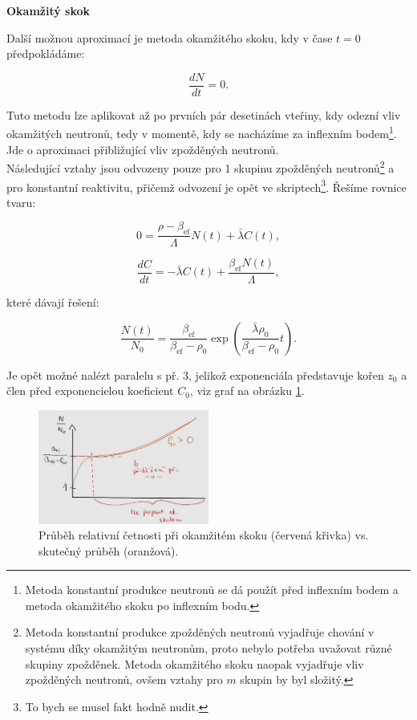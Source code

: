 \textbf{Okamžitý skok}

Další možnou aproximací je metoda okamžitého skoku, kdy v čase $t = 0$ předpokládáme:

$$ \dfrac{dN}{dt} = 0. $$

Tuto metodu lze aplikovat až po prvních pár desetinách vteřiny, kdy odezní vliv okamžitých neutronů, tedy v momentě, kdy se nacházíme za inflexním bodem\footnote{Metoda konstantní produkce neutronů se dá použít před inflexním bodem a metoda okamžitého skoku po inflexním bodu.}. Jde o aproximaci přibližující vliv zpožděných neutronů.\\

Následující vztahy jsou odvozeny pouze pro 1 skupinu zpožděných neutronů\footnote{Metoda konstantní produkce zpožděných neutronů vyjadřuje chování v systému díky okamžitým neutronům, proto nebylo potřeba uvažovat různé skupiny zpožděnek. Metoda okamžitého skoku naopak vyjadřuje vliv zpožděných neutronů, ovšem vztahy pro $m$ skupin by byl složitý.} a pro konstantní reaktivitu, přičemž odvození je opět ve skriptech\footnote{To bych se musel fakt hodně nudit.}. Řešíme rovnice tvaru:

$$ 0 = \dfrac{\rho - \beta_{\text{ef}}}{\Lambda} N(t) + \bar{\lambda} C(t), $$

$$ \dfrac{dC}{dt} = -\bar{\lambda} C(t) + \dfrac{\beta_{\text{ef}}  N(t)}{\Lambda}, $$

které dávají řešení:

$$ \dfrac{N(t)}{N_0} = \dfrac{\beta_{\text{ef}}}{\beta_{\text{ef}} - \rho_0} \exp{\left ( \dfrac{\bar{\lambda} \rho_0}{\beta_{\text{ef}} - \rho_0} t \right )}. $$

Je opět možné nalézt paralelu s př. 3, jelikož exponenciála představuje kořen $z_0$ a člen před exponencielou koeficient $C_0$, viz graf na obrázku \ref{fig_okamzity_skok}.

\begin{figure}[H]
  \centering
  \includegraphics[width=0.5\textwidth]{img/okamzity_skok.jpg}
  \caption{Průběh relativní četnosti při okamžitém skoku (červená křivka) vs. skutečný průběh (oranžová).}
  \label{fig_okamzity_skok}
\end{figure}

